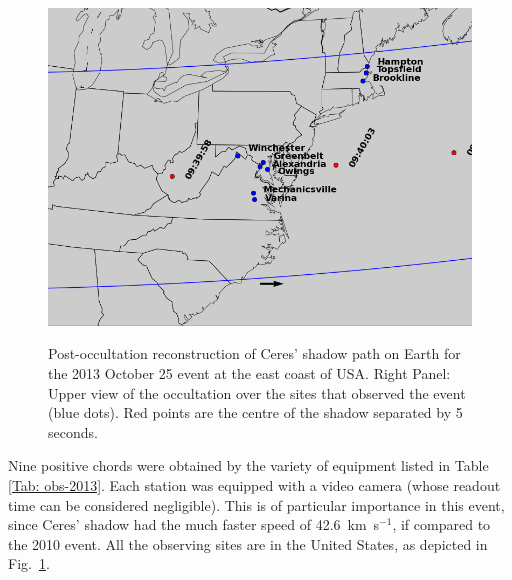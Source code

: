 \documentclass[useAMS,usenatbib]{mn2e}
\begin{document}
\begin{figure}
{\includegraphics[scale=0.42]{figures/Ceres_2013-zoom.png}}
\caption{Post-occultation reconstruction of Ceres' shadow path on Earth for the 2013 October 25 event at the east coast of USA. 
Right Panel: Upper view of the occultation over the sites that observed the event (blue dots). Red points are the centre of the shadow separated by 5 seconds.
\label{Fig: Ceres-2013-map}}
\end{figure}

Nine positive chords were obtained by the variety of equipment listed in Table \ref{Tab: obs-2013}. Each station was equipped with a video camera (whose readout time can be considered negligible). This is of particular importance in this event, since Ceres' shadow had the much faster speed of 42.6~km~s$^{-1}$, if compared to the 2010 event. All the observing sites are in the United States, as depicted in Fig.~\ref{Fig: Ceres-2013-map}.
\end{document}

